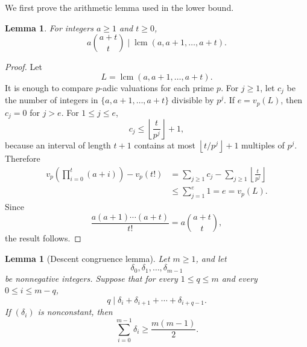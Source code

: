 \documentclass[10pt,a4paper]{amsart}
\newtheorem{lemma}[theorem]{Lemma}
\newcommand{\lcm}{\operatorname{lcm}}
\newcommand{\floor}[1]{\left\lfloor #1\right\rfloor}
\numberwithin{equation}{section}
\begin{document}
We first prove the arithmetic lemma used in the lower bound.

\begin{lemma}\label{lem:lcm}
For integers $a\ge1$ and $t\ge0$,
\[
        a\binom{a+t}{t}
        \mid
        \lcm(a,a+1,\ldots,a+t).
\]
\end{lemma}

\begin{proof}
Let
\[
        L=\lcm(a,a+1,\ldots,a+t).
\]
It is enough to compare $p$-adic valuations for each prime $p$.
For $j\ge1$, let $c_j$ be the number of integers in $\{a,a+1,\ldots,a+t\}$ divisible by $p^j$.
If $e=v_p(L)$, then $c_j=0$ for $j>e$.
For $1\le j\le e$,
\[
        c_j\le \floor{\frac{t}{p^j}}+1,
\]
because an interval of length $t+1$ contains at most $\floor{t/p^j}+1$ multiples of $p^j$.
Therefore
\[
\begin{aligned}
        v_p\!\left(\prod_{i=0}^t(a+i)\right)-v_p(t!)
        &=
        \sum_{j\ge1}c_j-
        \sum_{j\ge1}\floor{\frac{t}{p^j}} \\
        &\le
        \sum_{j=1}^e 1
        =e
        =v_p(L).
\end{aligned}
\]
Since
\[
        \frac{a(a+1)\cdots(a+t)}{t!}
        =
        a\binom{a+t}{t},
\]
the result follows.
\end{proof}

\begin{lemma}[Descent congruence lemma]\label{lem:sequence}
Let $m\ge1$, and let
\[
        \delta_0,\delta_1,\ldots,\delta_{m-1}
\]
be nonnegative integers.
Suppose that for every $1\le q\le m$ and every $0\le i\le m-q$,
\[
        q\mid \delta_i+\delta_{i+1}+\cdots+\delta_{i+q-1}.
\]
If $(\delta_i)$ is nonconstant, then
\[
        \sum_{i=0}^{m-1}\delta_i\ge \frac{m(m-1)}2.
\]
\end{lemma}
\end{document}
